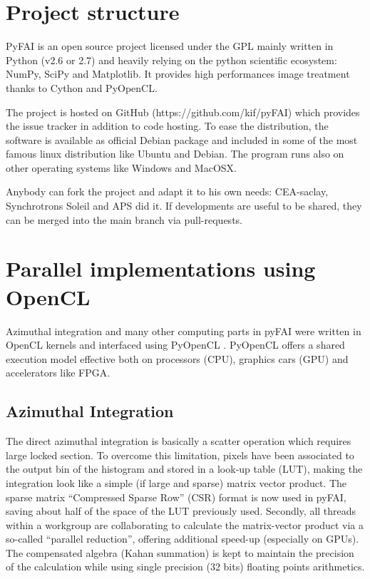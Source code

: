 \documentclass[preprint]{iucr}
\begin{document}


\appendix
\section{Project structure}
PyFAI is an open source project licensed under the GPL mainly written in Python (v2.6 or 2.7)
and heavily relying on the python scientific ecosystem: NumPy, SciPy and Matplotlib.
It provides high performances image treatment thanks to Cython and PyOpenCL.

The project is hosted on GitHub (https://github.com/kif/pyFAI) which provides
the issue tracker in addition to code hosting.
To ease the distribution, the
software is available as official Debian package and included in some of the
most famous linux distribution like Ubuntu and Debian.
The program runs also on other operating systems like Windows and MacOSX.

Anybody can fork the project and adapt it to his own needs: CEA-saclay,
Synchrotrons Soleil and APS did it. If developments are useful to be shared,
they can be merged into the main branch via pull-requests.

\section{Parallel implementations using OpenCL}
Azimuthal integration and many other computing parts in pyFAI were written in
OpenCL kernels and interfaced using PyOpenCL \cite{pyopencl}. PyOpenCL offers a
shared execution model effective both on processors (CPU), graphics cars (GPU)
and accelerators like FPGA.

\subsection{Azimuthal Integration}
The direct azimuthal integration is basically a scatter operation which
requires large locked section.
To overcome this limitation, pixels have been
associated to the output bin of the histogram and stored in a look-up
table (LUT), making the integration look like a simple (if large and sparse)
matrix vector product.
The sparse matrix ``Compressed Sparse Row'' (CSR) format is now used in pyFAI,
saving about half of the space of the LUT previously used.
Secondly, all threads within a workgroup are collaborating to calculate the
matrix-vector product via a so-called ``parallel reduction'', offering
additional speed-up (especially on GPUs).
The compensated algebra (Kahan summation) is kept to maintain the precision
of the calculation while using single precision (32 bits) floating points
arithmetics.
\end{document}
